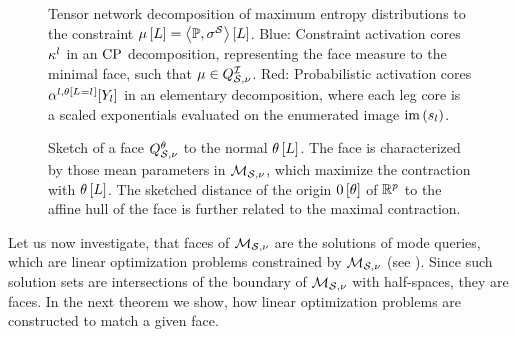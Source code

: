 \begin{figure}
    \begin{center}
        
    \end{center}
    \caption{
        Tensor network decomposition of maximum entropy distributions to the constraint $\mu\left[L\right]=\left\langle \mathbb{P},\sigma^{\mathcal{S}}\right\rangle \left[ L \right]$.
        Blue: Constraint activation cores $\kappa^{l}$ in an $\mathrm{CP}$ decomposition, representing the face measure to the minimal face, such that $\mu\in Q^{\mathcal{I}}_{\mathcal{S},\nu}$.
        Red: Probabilistic activation cores $\alpha^{l,\theta\left[L_{}=l_{}\right]}[Y_{l}]$ in an elementary decomposition, where each leg core is a scaled exponentials evaluated on the enumerated image $\mathrm{im}\left(s_{l}\right)$.
    }\label{fig:maxEntropyActcore}
\end{figure}




\begin{figure}[t!]
    \begin{center}
        
    \end{center}
    \caption{Sketch of a face $Q^{\theta}_{\mathcal{S},\nu}$ to the normal $\theta\left[L\right]$.
    The face is characterized by those mean parameters in $\mathcal{M}_{\mathcal{S},\nu}$, which maximize the contraction with $\theta\left[L\right]$.
    The sketched distance of the origin $0\left[\theta\right]$ of $\mathbb{R}^{p}$ to the affine hull of the face is further related to the maximal contraction.
    }\label{fig:meansetSketchFace}
\end{figure}

Let us now investigate, that faces of $\mathcal{M}_{\mathcal{S},\nu}$ are the solutions of mode queries, which are linear optimization problems constrained by $\mathcal{M}_{\mathcal{S},\nu}$ (see ).
Since such solution sets are intersections of the boundary of $\mathcal{M}_{\mathcal{S},\nu}$ with half-spaces, they are faces.
In the next theorem we show, how linear optimization problems are constructed to match a given face.

